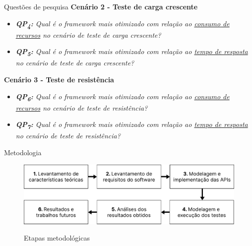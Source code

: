 \documentclass{libs/ufc_format}
\begin{document}
\begin{frame}{Questões de pesquisa}
    \textbf{Cenário 2 - Teste de carga crescente}
    \begin{itemize}
        \item \textit{\textbf{QP\textsubscript{4}:} Qual é o \textit{framework} mais otimizado com relação ao \underline{consumo de recursos} no cenário de teste de carga crescente?}
        \item \textit{\textbf{QP\textsubscript{5}:} Qual é o \textit{framework} mais otimizado com relação ao \underline{tempo de resposta} no cenário de teste de carga crescente?}
    \end{itemize}
    \vspace*{0.5em}
    \textbf{Cenário 3 - Teste de resistência}
    \begin{itemize}
        \item \textit{\textbf{QP\textsubscript{6}:} Qual é o \textit{framework} mais otimizado com relação ao \underline{consumo de recursos} no cenário de teste de resistência?}
        \item \textit{\textbf{QP\textsubscript{7}:} Qual é o \textit{framework} mais otimizado com relação ao \underline{tempo de resposta} no cenário de teste de resistência?}
    \end{itemize}
\end{frame}

\begin{frame}{Metodologia}
    \begin{figure}[H]
        \centering
        \caption{Etapas metodológicas}
        \includegraphics[width=1\linewidth]{figuras/diagrama-atividades2linhas.pdf}
        \captionsetup{justification=centering}
        \label{fig:etapas-metodologicas}
    \end{figure}
\end{frame}
\end{document}
